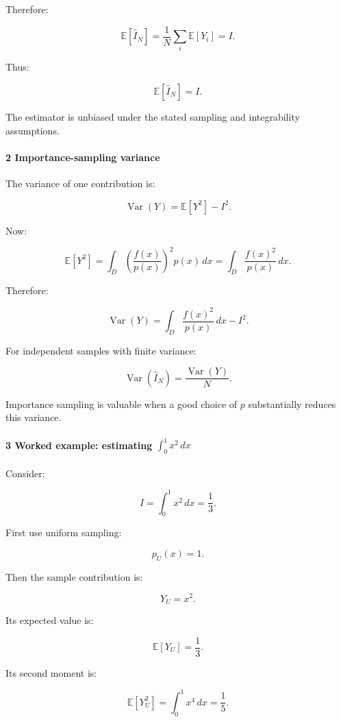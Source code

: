 Therefore:

\[
 \mathbb E[\widehat I_N] = \frac1N\sum_i\mathbb E[Y_i] =I.
\]

Thus:

\[
 \boxed{ \mathbb E[\widehat I_N]=I }.
\]

The estimator is unbiased under the stated sampling and integrability assumptions.

\paragraph{2 Importance-sampling variance}\label{importance-sampling-variance}

The variance of one contribution is:

\[
 \operatorname{Var}(Y) = \mathbb E[Y^2]-I^2.
\]

Now:

\[
 \mathbb E[Y^2] = \int_D \left(\frac{f(x)}{p(x)}\right)^2p(x)\,dx = \int_D\frac{f(x)^2}{p(x)}\,dx.
\]

Therefore:

\[
 \boxed{ \operatorname{Var}(Y) = \int_D\frac{f(x)^2}{p(x)}\,dx-I^2 }.
\]

For independent samples with finite variance:

\[
 \boxed{ \operatorname{Var}(\widehat I_N) = \frac{\operatorname{Var}(Y)}{N} }.
\]

Importance sampling is valuable when a good choice of \(p\) substantially reduces this variance.

\paragraph{\texorpdfstring{3 Worked example: estimating \(\int_0^1x^2\,dx\)}{3 Worked example: estimating \textbackslash int\_0\^{}1x\^{}2\textbackslash,dx}}\label{worked-example-estimating-int_01x2dx}

Consider:

\[
 I=\int_0^1x^2\,dx=\boxed{\frac13}.
\]

First use uniform sampling:

\[
 p_U(x)=1.
\]

Then the sample contribution is:

\[
 Y_U=x^2.
\]

Its expected value is:

\[
 \mathbb E[Y_U]=\frac13.
\]

Its second moment is:

\[
 \mathbb E[Y_U^2] = \int_0^1x^4\,dx =\frac15.
\]

